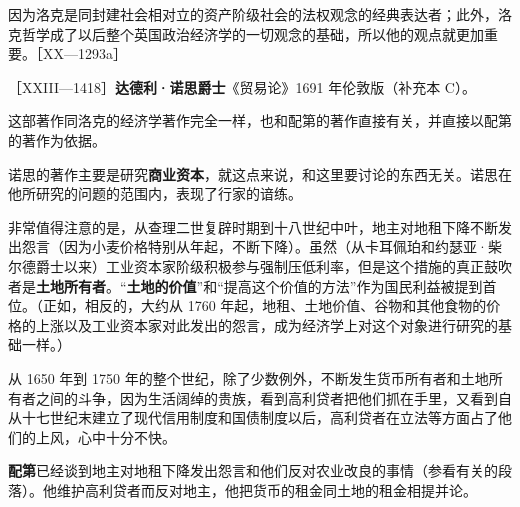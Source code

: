 因为洛克是同封建社会相对立的资产阶级社会的法权观念的经典表达者；此外，洛克哲学成了以后整个英国政治经济学的一切观念的基础，所以他的观点就更加重要。［XX—1293a］



［XXIII—1418］\textbf{达德利·诺思爵士}《贸易论》1691 年伦敦版（补充本 C）。

这部著作同洛克的经济学著作完全一样，也和配第的著作直接有关，并直接以配第的著作为依据。

诺思的著作主要是研究\textbf{商业资本}，就这点来说，和这里要讨论的东西无关。诺思在他所研究的问题的范围内，表现了行家的谙练。

非常值得注意的是，从查理二世复辟时期到十八世纪中叶，地主对地租下降不断发出怨言（因为小麦价格特别从年起，不断下降）。虽然（从卡耳佩珀和约瑟亚·柴尔德爵士以来）工业资本家阶级积极参与强制压低利率，但是这个措施的真正鼓吹者是\textbf{土地所有者}。“\textbf{土地的价值}”和“提高这个价值的方法”作为国民利益被提到首位。（正如，相反的，大约从 1760 年起，地租、土地价值、谷物和其他食物的价格的上涨以及工业资本家对此发出的怨言，成为经济学上对这个对象进行研究的基础一样。）

从 1650 年到 1750 年的整个世纪，除了少数例外，不断发生货币所有者和土地所有者之间的斗争，因为生活阔绰的贵族，看到高利贷者把他们抓在手里，又看到自从十七世纪末建立了现代信用制度和国债制度以后，高利贷者在立法等方面占了他们的上风，心中十分不快。

\textbf{配第}已经谈到地主对地租下降发出怨言和他们反对农业改良的事情（参看有关的段落）。他维护高利贷者而反对地主，他把货币的租金同土地的租金相提并论。

